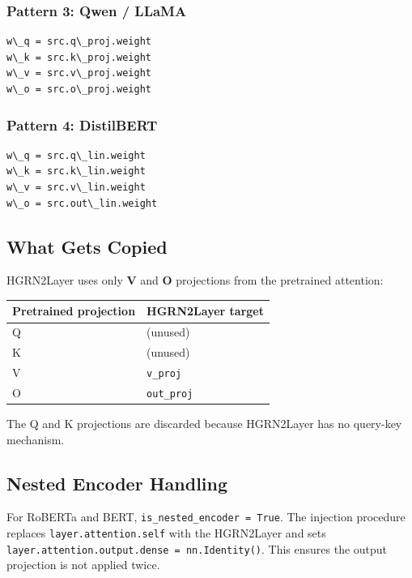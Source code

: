 \subsubsection{Pattern 3: Qwen / LLaMA}

\begin{lstlisting}
w\_q = src.q\_proj.weight
w\_k = src.k\_proj.weight
w\_v = src.v\_proj.weight
w\_o = src.o\_proj.weight
\end{lstlisting}

\subsubsection{Pattern 4: DistilBERT}

\begin{lstlisting}
w\_q = src.q\_lin.weight
w\_k = src.k\_lin.weight
w\_v = src.v\_lin.weight
w\_o = src.out\_lin.weight
\end{lstlisting}

\subsection{What Gets Copied}

HGRN2Layer uses only \textbf{V} and \textbf{O} projections from the pretrained attention:

\begin{table}[H]
\centering
\small
\begin{tabular}{ll}
\toprule
\textbf{Pretrained projection} & \textbf{HGRN2Layer target} \\
\midrule
Q & (unused) \\
K & (unused) \\
V & \texttt{v\_proj} \\
O & \texttt{out\_proj} \\
\bottomrule
\end{tabular}
\end{table}

The Q and K projections are discarded because HGRN2Layer has no query-key 
mechanism.

\subsection{Nested Encoder Handling}

For RoBERTa and BERT, \texttt{is\_nested\_encoder = True}. The injection procedure 
replaces \texttt{layer.attention.self} with the HGRN2Layer and sets 
\texttt{layer.attention.output.dense = nn.Identity()}. This ensures the output 
projection is not applied twice.


